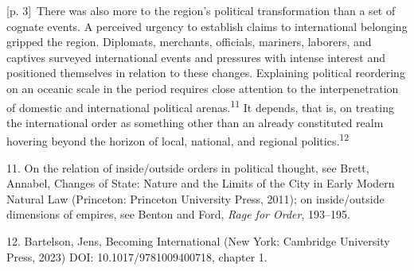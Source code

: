 \documentclass[10pt,a4paper]{article}
\begin{document}
{\scriptsize\color{gray} [p. 3]}\ There was also more to the region’s political transformation than a set of cognate events. A perceived urgency to establish claims to international belonging gripped the region. Diplomats, merchants, officials, mariners, laborers, and captives surveyed international events and pressures with intense interest and positioned themselves in relation to these changes. Explaining political reordering on an oceanic scale in the period requires close attention to the interpenetration of domestic and international political arenas.\nobreak\textsuperscript{11} It depends, that is, on treating the international order as something other than an already constituted realm hovering beyond the horizon of local, national, and regional politics.\nobreak\textsuperscript{12}\par{\small 11. On the relation of inside/outside orders in political thought, see Brett, Annabel, Changes of State: Nature and the Limits of the City in Early Modern Natural Law (Princeton: Princeton University Press, 2011); on inside/outside dimensions of empires, see Benton and Ford, \textit{Rage for Order}, 193–195.\par}{\small 12. Bartelson, Jens, Becoming International (New York: Cambridge University Press, 2023) DOI: 10.1017/9781009400718, chapter 1.\par}
\end{document}
